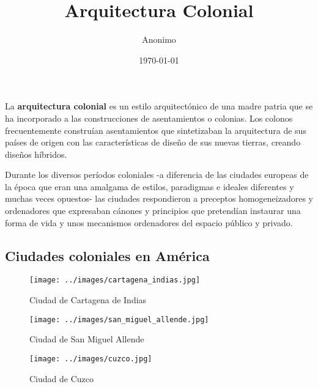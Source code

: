 \documentclass{article}
\begin{document}
	\title{Arquitectura Colonial}
	\author{Anonimo}
	\date{\today}
	\maketitle
	La \textbf{arquitectura colonial} es un estilo arquitect\'onico de una madre patria que 
	se ha incorporado a las construcciones de asentamientos o colonias. Los colonos 
	frecuentemente constru\'ian asentamientos que sintetizaban la arquitectura de sus 
	pa\'ises de origen con las caracter\'isticas de dise\~no de sus nuevas tierras, creando 
	dise\~nos h\'ibridos.\newline
  
	Durante los diversos per\'iodos coloniales -a diferencia de las ciudades europeas 
	de la \'epoca que eran una amalgama de estilos, paradigmas e ideales diferentes y 
	muchas veces opuestos- las ciudades respondieron a preceptos homogeneizadores y 
	ordenadores que expresaban c\'anones y principios que pretend\'ian instaurar una 
	forma de vida y unos mecanismos ordenadores del espacio p\'ublico y privado.\newline
  

	\subsection*{ Ciudades coloniales en Am\'erica}

	\begin{figure}[!ht]
		\centering
		\texttt{[image: ../images/cartagena\_indias.jpg]}
		\caption{Ciudad de Cartagena de Indias}
	\end{figure}

	\begin{figure}[!ht]
		\centering
		\texttt{[image: ../images/san\_miguel\_allende.jpg]}
		\caption{Ciudad de San Miguel Allende}
	\end{figure}

	\begin{figure}[!ht]
		\centering
		\texttt{[image: ../images/cuzco.jpg]}
		\caption{Ciudad de Cuzco}
	\end{figure}
\end{document}
